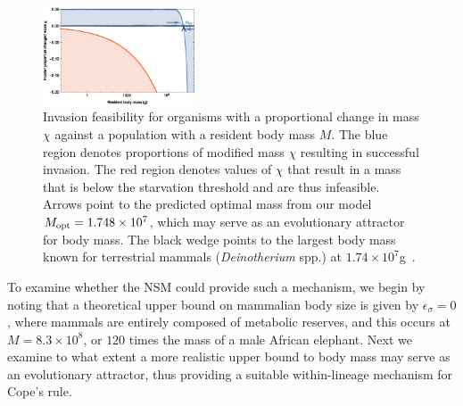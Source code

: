 \documentclass[twocolumn,preprintnumbers,amsmath,amssymb,superscriptaddress]{revtex4}
\begin{document}
\begin{bibunit}[unsrt]
\begin{figure}
\centering
\includegraphics[width=0.4\textwidth]{fig_Invasion.eps}
\caption{\small{ Invasion feasibility for organisms with a proportional change in
  mass $\chi$ against a population with a resident body mass $M$.  The blue
  region denotes proportions of modified mass $\chi$ resulting in successful invasion.  The
  red region denotes values of $\chi$ that result in a mass that is below the
  starvation threshold and are thus infeasible.
  Arrows point to the predicted optimal mass from our model $M_{\rm opt}=1.748\times 10^7$, which may serve as an evolutionary attractor for body mass.
  The black wedge points to the largest body mass known for terrestrial mammals (\emph{Deinotherium} spp.) at $1.74\times10^7$g~\citep{Smith:2010p3442}.}\label{fig:invasion}}
\end{figure}


To examine whether the NSM could provide such a mechanism, we begin by noting that a theoretical upper bound on mammalian body size is given by $\epsilon_\sigma=0$, where mammals are entirely composed of metabolic reserves, and this occurs at $M=8.3\times 10^8$, or $120$ times the mass of a male African elephant.
Next we examine to what extent a more realistic upper bound to body mass may serve as an evolutionary attractor, thus providing a suitable within-lineage mechanism for Cope's rule.


\end{bibunit}
\end{document}
